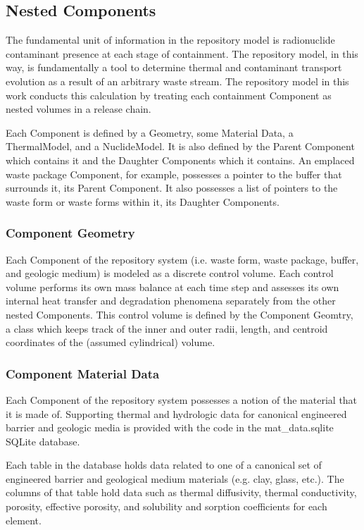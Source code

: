 \subsection{Nested Components}

The fundamental unit of information in the repository model is radionuclide 
contaminant presence at each stage of containment.  The repository model, in 
this way, is fundamentally a tool to determine thermal and contaminant 
transport evolution as a result of an arbitrary waste stream. The repository 
model in this work conducts this calculation by  treating each containment 
Component as nested volumes in a release chain. 

Each Component is defined by a Geometry, some Material Data, a ThermalModel, 
and a NuclideModel. It is also defined by the Parent Component which contains 
it and the Daughter Components which it contains. An emplaced waste package 
Component, for example, possesses a pointer to the buffer that surrounds it, 
its Parent Component. It also possesses a list of pointers to the waste form or 
waste forms within it, its Daughter Components. 

\subsubsection{Component Geometry}

Each Component of the repository system (i.e. waste form, waste package, buffer, 
and geologic medium) is modeled as a discrete control volume. Each control 
volume performs its own mass balance at each time step and assesses its own 
internal  heat transfer and degradation phenomena separately from the other 
nested Components. This control volume is defined by the Component Geomtry, 
a class which keeps track of the inner and outer radii, length, and centroid 
coordinates of the (assumed cylindrical) volume.

\subsubsection{Component Material Data}

Each Component of the repository system possesses a notion of the material that 
it is made of. Supporting thermal and hydrologic data for canonical engineered 
barrier and geologic media is provided with the code in the 
mat\_data.sqlite SQLite database.

Each table in the database holds data related to one of a canonical set of 
engineered barrier and geological medium materials (e.g. clay, glass, etc.).  
The columns of that table hold data such as thermal diffusivity, thermal 
conductivity, porosity, effective porosity, and solubility and sorption 
coefficients for each element.  

